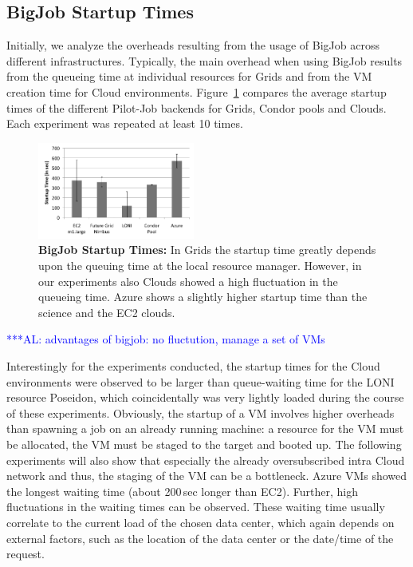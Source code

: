 \documentclass[conference,final]{IEEEtran}
\newcommand{\up}{\vspace*{-1em}}
\newcommand{\alnote}[1]{ {\textcolor{blue} { ***AL: #1 }}}
\newcommand{\alnote}[1]{}
\begin{document}
\subsection{BigJob Startup Times} 

Initially, we analyze the overheads resulting from the usage of BigJob across
different infrastructures. Typically, the main overhead when using
BigJob results from the queueing time at individual resources for
Grids and from the VM creation time for Cloud environments.
Figure~\ref{fig:performance_setup_time} compares the average startup times of
the different Pilot-Job backends for Grids, Condor pools and Clouds. Each 
experiment was repeated at least 10 times.

\begin{figure}[htbp]
    \centering
        \includegraphics[width=0.46\textwidth]{performance/setup-times}
    \caption{\textbf{BigJob Startup Times:} In Grids the startup time
      greatly depends upon the queuing time at the local resource
      manager. However, in our experiments also Clouds showed a high
      fluctuation in the queueing time. Azure shows a slightly higher
      startup time than the science and the EC2 clouds.\up}
    \label{fig:performance_setup_time}
\end{figure}
\alnote{advantages of bigjob: no fluctution, manage a set of VMs}

Interestingly for the experiments conducted, the startup times for the
Cloud environments were observed to be larger than queue-waiting time
for the LONI resource Poseidon, which coincidentally was very lightly
loaded during the course of these experiments. Obviously, the startup
of a VM involves higher overheads than spawning a job on an already
running machine: a resource for the VM must be allocated, the VM must
be staged to the target and booted up. The following experiments will
also show that especially the already oversubscribed intra Cloud
network and thus, the staging of the VM can be a bottleneck. Azure VMs
showed the longest waiting time (about 200\,sec longer than EC2). Further,
high fluctuations in the waiting times can be observed. These waiting time
usually correlate to the current load of the chosen data center, which again
depends on external factors, such as the location of the data center or 
the date/time of the request.
\end{document}
